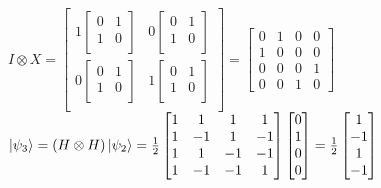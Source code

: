 \documentclass{iansnotes}
\begin{document}
$I \otimes X = \begin{bmatrix}
  1 \begin{bmatrix} 0 & 1 \\ 1 & 0 \\ \end{bmatrix} & 0 \begin{bmatrix} 0 & 1 \\ 1 & 0 \\ \end{bmatrix} \\[5mm]
  0 \begin{bmatrix} 0 & 1 \\ 1 & 0 \\ \end{bmatrix} & 1 \begin{bmatrix} 0 & 1 \\ 1 & 0 \\ \end{bmatrix} \\
\end{bmatrix} = \begin{bmatrix} 0 & 1 & 0 & 0 \\ 1 & 0 & 0 & 0 \\ 0 & 0 & 0 & 1 \\ 0 & 0 & 1 & 0 \end{bmatrix}$ \\[16mm]
$\ket{\psi_3} = (H \otimes H) \ket{\psi_2} = \frac{1}{2} \begin{bmatrix} 1 & 1 & 1 & 1 \\ 1 & -1 & 1 & -1 \\ 1 & 1 & -1 & -1 \\ 1 & -1 & -1 & 1 \end{bmatrix} \begin{bmatrix} 0 \\ 1 \\ 0 \\ 0 \end{bmatrix} = \frac{1}{2}\begin{bmatrix} 1 \\ -1 \\ 1 \\ -1 \end{bmatrix}$ \\[16mm]
\end{document}
